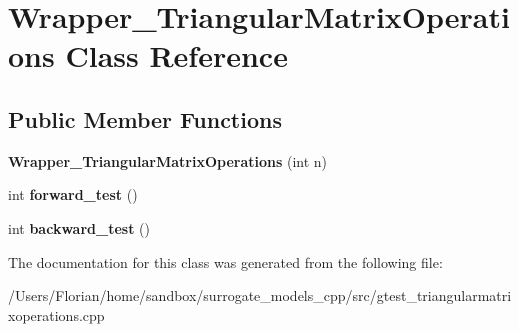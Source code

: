 \hypertarget{class_wrapper___triangular_matrix_operations}{}\section{Wrapper\+\_\+\+Triangular\+Matrix\+Operations Class Reference}
\label{class_wrapper___triangular_matrix_operations}
\subsection*{Public Member Functions}
\begin{DoxyCompactItemize}
\item 
{\bfseries Wrapper\+\_\+\+Triangular\+Matrix\+Operations} (int n)\hypertarget{class_wrapper___triangular_matrix_operations_a3bab29c0cce2a61929120a58bdd212f0}{}\label{class_wrapper___triangular_matrix_operations_a3bab29c0cce2a61929120a58bdd212f0}

\item 
int {\bfseries forward\+\_\+test} ()\hypertarget{class_wrapper___triangular_matrix_operations_a048a7912ef28f6ed82976d99cd1375d6}{}\label{class_wrapper___triangular_matrix_operations_a048a7912ef28f6ed82976d99cd1375d6}

\item 
int {\bfseries backward\+\_\+test} ()\hypertarget{class_wrapper___triangular_matrix_operations_a2ba8b5c49cf2d910580494f4108eb2b5}{}\label{class_wrapper___triangular_matrix_operations_a2ba8b5c49cf2d910580494f4108eb2b5}

\end{DoxyCompactItemize}


The documentation for this class was generated from the following file\+:\begin{DoxyCompactItemize}
\item 
/\+Users/\+Florian/home/sandbox/surrogate\+\_\+models\+\_\+cpp/src/gtest\+\_\+triangularmatrixoperations.\+cpp\end{DoxyCompactItemize}
